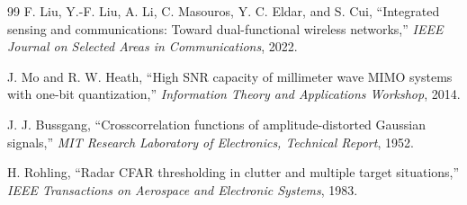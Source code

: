 \documentclass[12pt,a4paper]{ctexart}
\begin{document}
\begin{thebibliography}{99}
F. Liu, Y.-F. Liu, A. Li, C. Masouros, Y. C. Eldar, and S. Cui,
``Integrated sensing and communications: Toward dual-functional wireless networks,''
\emph{IEEE Journal on Selected Areas in Communications}, 2022.

J. Mo and R. W. Heath,
``High SNR capacity of millimeter wave MIMO systems with one-bit quantization,''
\emph{Information Theory and Applications Workshop}, 2014.

J. J. Bussgang,
``Crosscorrelation functions of amplitude-distorted Gaussian signals,''
\emph{MIT Research Laboratory of Electronics, Technical Report}, 1952.

H. Rohling,
``Radar CFAR thresholding in clutter and multiple target situations,''
\emph{IEEE Transactions on Aerospace and Electronic Systems}, 1983.
\end{thebibliography}
\end{document}
